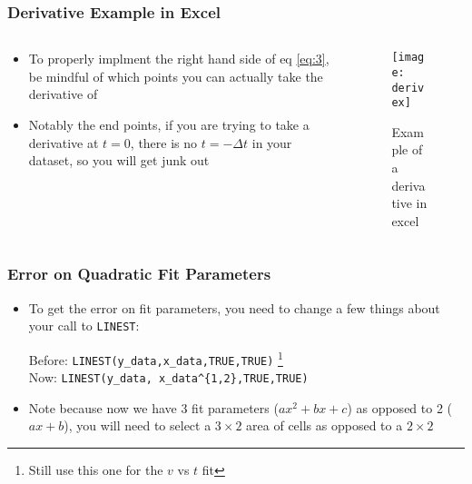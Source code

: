 \documentclass[aspectratio=169]{beamer}
\begin{document}
\begin{frame}
  \frametitle{Derivative Example in Excel}
  \begin{columns}
    \begin{column}{0.5\textwidth}
      \begin{itemize}
      \item To properly implment the right hand side of eq \eqref{eq:3}, be mindful of which points you can actually take the derivative of
      \item Notably the end points, if you are trying to take a derivative at $t=0$, there is no $t=-\Delta t$ in your dataset, so you will get junk out
      \end{itemize}
    \end{column}
    \begin{column}{0.5\textwidth}
      \begin{figure}[H]
        \centering
        \texttt{[image: derivex]}
        \caption{Example of a derivative in excel}
        \label{fig:2}
      \end{figure}
    \end{column}
  \end{columns}
\end{frame}

\begin{frame}
  \frametitle{Error on Quadratic Fit Parameters}
  \begin{itemize}
  \item To get the error on fit parameters, you need to change a few things about your call to \texttt{LINEST}:
    \begin{center}
      Before: \texttt{LINEST(y\_data,x\_data,TRUE,TRUE)}
      \footnote{Still use this one for the $v$ vs $t$ fit}\\
      Now: \texttt{LINEST(y\_data,{\color{red} x\_data\^{}\{1,2\}},TRUE,TRUE)}
    \end{center}
  \item Note because now we have 3 fit parameters ($ax^2+bx+c$) as opposed to 2 ($ax+b$), you will need to select a $3\times2$ area of cells as opposed to a $2\times2$
  \end{itemize}
\end{frame}
\end{document}
